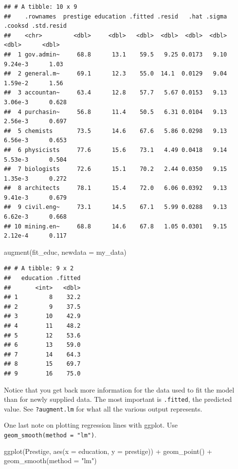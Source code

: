 \documentclass[
  12pt,
  oneside,openany]{book}
\newenvironment{Shaded}{\begin{snugshade}}{\end{snugshade}}
\newcommand{\AttributeTok}[1]{\textcolor[rgb]{0.77,0.63,0.00}{#1}}
\newcommand{\FunctionTok}[1]{\textcolor[rgb]{0.00,0.00,0.00}{#1}}
\newcommand{\NormalTok}[1]{#1}
\newcommand{\SpecialCharTok}[1]{\textcolor[rgb]{0.00,0.00,0.00}{#1}}
\newcommand{\StringTok}[1]{\textcolor[rgb]{0.31,0.60,0.02}{#1}}
\begin{document}
\begin{verbatim}
## # A tibble: 10 x 9
##    .rownames  prestige education .fitted .resid   .hat .sigma .cooksd .std.resid
##    <chr>         <dbl>     <dbl>   <dbl>  <dbl>  <dbl>  <dbl>   <dbl>      <dbl>
##  1 gov.admin~     68.8      13.1    59.5   9.25 0.0173   9.10 9.24e-3      1.03 
##  2 general.m~     69.1      12.3    55.0  14.1  0.0129   9.04 1.59e-2      1.56 
##  3 accountan~     63.4      12.8    57.7   5.67 0.0153   9.13 3.06e-3      0.628
##  4 purchasin~     56.8      11.4    50.5   6.31 0.0104   9.13 2.56e-3      0.697
##  5 chemists       73.5      14.6    67.6   5.86 0.0298   9.13 6.56e-3      0.653
##  6 physicists     77.6      15.6    73.1   4.49 0.0418   9.14 5.53e-3      0.504
##  7 biologists     72.6      15.1    70.2   2.44 0.0350   9.15 1.35e-3      0.272
##  8 architects     78.1      15.4    72.0   6.06 0.0392   9.13 9.41e-3      0.679
##  9 civil.eng~     73.1      14.5    67.1   5.99 0.0288   9.13 6.62e-3      0.668
## 10 mining.en~     68.8      14.6    67.8   1.05 0.0301   9.15 2.12e-4      0.117
\end{verbatim}

\begin{Shaded}
\begin{Highlighting}[]
\FunctionTok{augment}\NormalTok{(fit\_educ,}
        \AttributeTok{newdata =}\NormalTok{ my\_data)}
\end{Highlighting}
\end{Shaded}

\begin{verbatim}
## # A tibble: 9 x 2
##   education .fitted
##       <int>   <dbl>
## 1         8    32.2
## 2         9    37.5
## 3        10    42.9
## 4        11    48.2
## 5        12    53.6
## 6        13    59.0
## 7        14    64.3
## 8        15    69.7
## 9        16    75.0
\end{verbatim}

Notice that you get back more information for the data used to fit the model than for newly supplied data. The most important is \texttt{.fitted}, the predicted value. See \texttt{?augment.lm} for what all the various output represents.

One last note on plotting regression lines with ggplot. Use \texttt{geom\_smooth(method\ =\ "lm")}.

\begin{Shaded}
\begin{Highlighting}[]
\FunctionTok{ggplot}\NormalTok{(Prestige, }\FunctionTok{aes}\NormalTok{(}\AttributeTok{x =}\NormalTok{ education, }\AttributeTok{y =}\NormalTok{ prestige)) }\SpecialCharTok{+}
  \FunctionTok{geom\_point}\NormalTok{() }\SpecialCharTok{+}
  \FunctionTok{geom\_smooth}\NormalTok{(}\AttributeTok{method =} \StringTok{"lm"}\NormalTok{)}
\end{Highlighting}
\end{Shaded}
\end{document}
